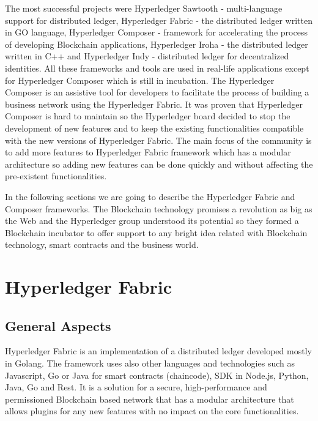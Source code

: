 The most successful projects were Hyperledger Sawtooth - multi-language support for distributed ledger, Hyperledger Fabric - the distributed ledger written in GO language, Hyperledger Composer - framework for accelerating the process of developing Blockchain applications, Hyperledger Iroha - the distributed ledger written in C++ and Hyperledger Indy - distributed ledger for decentralized identities.
All these frameworks and tools are used in real-life applications except for Hyperledger Composer which is still in incubation. The Hyperledger Composer is an assistive tool for developers to facilitate the process of building a business network using the Hyperledger Fabric. 
It was proven that Hyperledger Composer is hard to maintain so the Hyperledger board decided to stop the development of new features and to keep the existing functionalities compatible with the new versions of Hyperledger Fabric.
The main focus of the community is to add more features to Hyperledger Fabric framework which has a modular architecture so adding new features can be done quickly and without affecting the pre-existent functionalities.

In the following sections we are going to describe the Hyperledger Fabric and Composer frameworks. The Blockchain technology promises a revolution as big as the Web and the Hyperledger group understood its potential so they formed a Blockchain incubator to offer support to any bright idea related with Blockchain technology, smart contracts and the business world.

\section{Hyperledger Fabric}
\label{sec:chapter1-section2}

\subsection{General Aspects}
\label{sub-sec:chapter1-subsection1}
Hyperledger Fabric is an implementation of a distributed ledger developed mostly in Golang. The framework uses also other languages and technologies such as Javascript, Go or Java for smart contracts (chaincode), SDK in Node.js, Python, Java, Go and Rest.
It is a solution for a secure, high-performance and permissioned Blockchain based network that has a modular architecture that allows plugins for any new features with no impact on the core functionalities.

